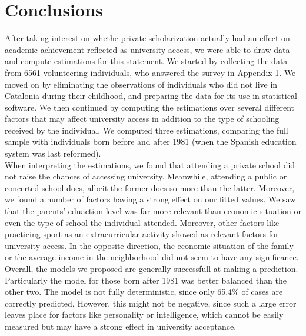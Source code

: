 \documentclass[12pt]{article}
\begin{document}
\section{Conclusions}
After taking interest on whethe private scholarization actually had an effect on academic achievement reflected as university access, we were able to draw data and compute estimations for this statement. We started by collecting the data from 6561 volunteering individuals, who answered the survey in Appendix 1. We moved on by eliminating the observations of individuals who did not live in Catalonia during their childhood, and preparing the data for its use in statistical software. We then continued by computing the estimations over several different factors that may affect university access in addition to the type of schooling received by the individual. We computed three estimations, comparing the full sample with individuals born before and after 1981 (when the Spanish education system was last reformed).\\
When interpreting the estimations, we found that attending a private school did not raise the chances of accessing university. Meanwhile, attending a public or concerted school does, albeit the former does so more than the latter. Moreover, we found a number of factors having a strong effect on our fitted values. We saw that the parents' eduaction level was far more relevant than economic situation or even the type of school the individual attended. Moreover, other factors like practicing sport as an extracurricular activity showed as relevant factors for university access. In the opposite direction, the economic situation of the family or the average income in the neighborhood did not seem to have any significance.\\
Overall, the models we proposed are generally successfull at making a prediction. Particularly the model for those born after 1981 was better balanced than the other two. The model is not fully deterministic, since only 65.4\% of cases are correctly predicted. However, this might not be negative, since such a large error leaves place for factors like personality or intelligence, which cannot be easily measured but may have a strong effect in university acceptance.\\
\end{document}

